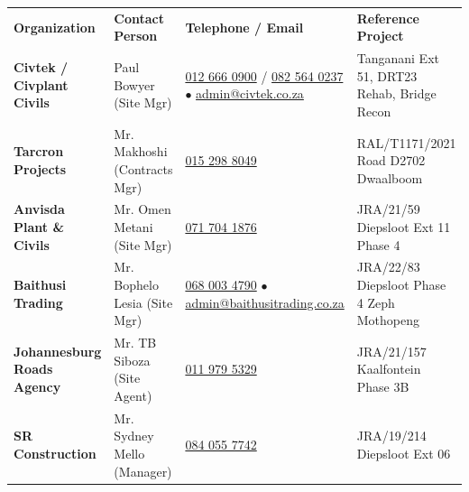 \documentclass[a4paper,11pt]{article}
\begin{document}
\renewcommand{\arraystretch}{1.30}
\begin{tabularx}{\textwidth}{@{}p{3.8cm} p{2.8cm} p{3.4cm} X@{}}
\rowcolor{mhnavy}
{\color{white}\bfseries\fontsize{8pt}{9.8pt}\selectfont Organization} &
{\color{white}\bfseries\fontsize{8pt}{9.8pt}\selectfont Contact Person} &
{\color{white}\bfseries\fontsize{8pt}{9.8pt}\selectfont Telephone / Email} &
{\color{white}\bfseries\fontsize{8pt}{9.8pt}\selectfont Reference Project} \\
\rowcolor{mhbluelight}
\fontsize{7.6pt}{9.4pt}\selectfont\bfseries Civtek / Civplant Civils & \fontsize{7.6pt}{9.4pt}\selectfont Paul Bowyer (Site Mgr) & \fontsize{7.6pt}{9.4pt}\selectfont \href{tel:0126660900}{012 666 0900} / \href{tel:0825640237}{082 564 0237} $\bullet$ \href{mailto:admin@civtek.co.za}{admin@civtek.co.za} & \fontsize{7.6pt}{9.4pt}\selectfont Tanganani Ext 51, DRT23 Rehab, Bridge Recon \\
\fontsize{7.6pt}{9.4pt}\selectfont\bfseries Tarcron Projects & \fontsize{7.6pt}{9.4pt}\selectfont Mr. Makhoshi (Contracts Mgr) & \fontsize{7.6pt}{9.4pt}\selectfont \href{tel:0152988049}{015 298 8049} & \fontsize{7.6pt}{9.4pt}\selectfont RAL/T1171/2021 Road D2702 Dwaalboom \\
\rowcolor{mhbluelight}
\fontsize{7.6pt}{9.4pt}\selectfont\bfseries Anvisda Plant \& Civils & \fontsize{7.6pt}{9.4pt}\selectfont Mr. Omen Metani (Site Mgr) & \fontsize{7.6pt}{9.4pt}\selectfont \href{tel:0717041876}{071 704 1876} & \fontsize{7.6pt}{9.4pt}\selectfont JRA/21/59 Diepsloot Ext 11 Phase 4 \\
\fontsize{7.6pt}{9.4pt}\selectfont\bfseries Baithusi Trading & \fontsize{7.6pt}{9.4pt}\selectfont Mr. Bophelo Lesia (Site Mgr) & \fontsize{7.6pt}{9.4pt}\selectfont \href{tel:0680034790}{068 003 4790} $\bullet$ \href{mailto:admin@baithusitrading.co.za}{admin@baithusitrading.co.za} & \fontsize{7.6pt}{9.4pt}\selectfont JRA/22/83 Diepsloot Phase 4 Zeph Mothopeng \\
\rowcolor{mhbluelight}
\fontsize{7.6pt}{9.4pt}\selectfont\bfseries Johannesburg Roads Agency & \fontsize{7.6pt}{9.4pt}\selectfont Mr. TB Siboza (Site Agent) & \fontsize{7.6pt}{9.4pt}\selectfont \href{tel:0119795329}{011 979 5329} & \fontsize{7.6pt}{9.4pt}\selectfont JRA/21/157 Kaalfontein Phase 3B \\
\fontsize{7.6pt}{9.4pt}\selectfont\bfseries SR Construction & \fontsize{7.6pt}{9.4pt}\selectfont Mr. Sydney Mello (Manager) & \fontsize{7.6pt}{9.4pt}\selectfont \href{tel:0840557742}{084 055 7742} & \fontsize{7.6pt}{9.4pt}\selectfont JRA/19/214 Diepsloot Ext 06 \\

\end{tabularx}
\end{document}
